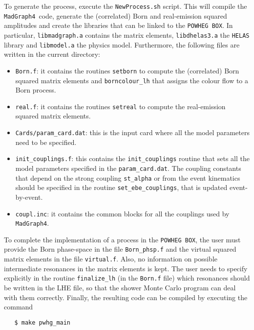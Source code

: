 \documentclass[paper]{JHEP3}
\newcommand\sss{\mathchoice%
{\displaystyle}%
{\scriptstyle}%
{\scriptscriptstyle}%
{\scriptscriptstyle}%
}
\newcommand\POWHEGBOX{{\tt POWHEG BOX}}
\newcommand\MG{{\tt MadGraph4}}
\newcommand\HELAS{{\tt HELAS}}
\begin{document}
To generate the process, execute the \verb|NewProcess.sh| script. This will
compile the \MG\ code, generate the (correlated) Born and real-emission
squared amplitudes and create the libraries that can be linked to the
\POWHEGBOX. In particular, \verb|libmadgraph.a| contains the matrix elements,
\verb|libdhelas3.a| the \HELAS{} library and \verb|libmodel.a| the physics
model. Furthermore, the following files are written in the current directory:
\begin{itemize}
\item \verb|Born.f|: it contains the routines \verb|setborn| to compute
  the (correlated) Born squared matrix elements and
  \verb|borncolour_lh| that assigns the colour flow to a Born process.
\item \verb|real.f|: it contains the routines \verb|setreal| to compute
  the real-emission squared matrix elements.
\item \verb|Cards/param_card.dat|: this is the input card where all the model
  parameters need to be specified.
\item \verb|init_couplings.f|: this contains the \verb|init_couplings|
  routine that sets all the model parameters specified in the
  \verb|param_card.dat|. The coupling constants that depend on the strong
  coupling \verb|st_alpha| or from the event kinematics 
should be specified in the routine \verb|set_ebe_couplings|, that is updated
event-by-event.
\item \verb|coupl.inc|: it contains the common blocks for all the couplings
  used by \MG.
\end{itemize}
To complete the implementation of a process in the \POWHEGBOX{}, the user
must provide the Born phase-space in the file \verb|Born_phsp.f| and the
virtual squared matrix elements in the file \verb|virtual.f|. Also, no
information on possible intermediate resonances in the matrix elements is
kept. The user needs to specify explicitly in the routine \verb|finalize_lh|
(in the \verb|Born.f| file) which resonances should be written in the LHE
file, so that the shower Monte Carlo program can deal with them correctly.
Finally, the resulting code can be compiled  by executing the command
\begin{verbatim}
   $ make pwhg_main
\end{verbatim}
\end{document}
